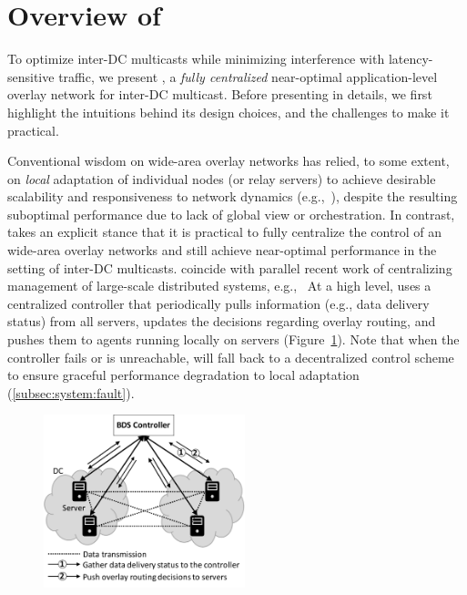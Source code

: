 \section{Overview of \name}
\label{sec:overview}

To optimize inter-DC multicasts while minimizing interference with 
latency-sensitive traffic, we present {\em \name}, a {\em fully centralized} 
near-optimal application-level overlay network for inter-DC multicast. 
Before presenting \name in details, we first highlight the intuitions 
behind its design choices, and the challenges to make it practical.


Conventional wisdom on wide-area overlay networks has relied, to 
some extent, on {\em local} adaptation of individual nodes (or 
relay servers) to achieve desirable scalability and responsiveness 
to network dynamics 
(e.g.,~\cite{Andreev2013Designing,Repantis2010Scaling,Huang2014A,mukerjee2014enabling}),
despite the resulting suboptimal performance due to lack of global 
view or orchestration. 
In contrast, \name takes an explicit stance that it is practical to 
fully centralize the control of an wide-area overlay networks and 
still achieve near-optimal performance in the setting of inter-DC 
multicasts. \name coincide with parallel recent work of centralizing
management of large-scale distributed systems, e.g.,~\cite{gog2016firmament}
At a high level, \name uses a centralized controller that 
periodically pulls information (e.g., data delivery status) from all 
servers, updates the decisions regarding overlay routing, and pushes 
them to agents running locally on servers 
(Figure~\ref{fig:framework}).
Note that when the controller fails or is unreachable, \name will 
fall back to a decentralized control scheme to ensure graceful 
performance degradation to local adaptation 
(\Section\ref{subsec:system:fault}).

\begin{figure}[t]
  \centering
  \includegraphics[width=2.3in]{images/framework-new.pdf}
    \vspace{-0.2cm}
  \label{fig:framework}
\vspace{-0.4cm}
\end{figure}

